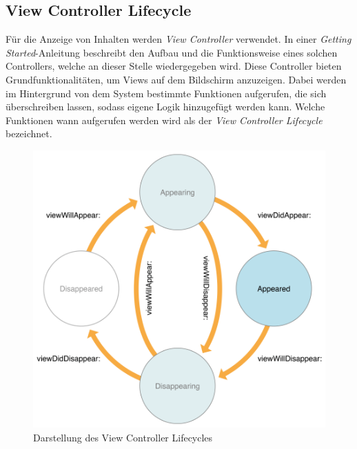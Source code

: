 \subsection{View Controller Lifecycle}
Für die Anzeige von Inhalten werden \textit{View Controller} verwendet.
In einer \textit{Getting Started}-Anleitung beschreibt \textcite{APP2016} den Aufbau und die Funktionsweise eines solchen Controllers, welche an dieser Stelle wiedergegeben wird.
Diese Controller bieten Grundfunktionalitäten, um Views auf dem Bildschirm anzuzeigen.
Dabei werden im Hintergrund von dem System bestimmte Funktionen aufgerufen, die sich überschreiben lassen, sodass eigene Logik hinzugefügt werden kann.
Welche Funktionen wann aufgerufen werden wird als der \textit{View Controller Lifecycle} bezeichnet.
\begin{figure}[h!]
	\centering
	\includegraphics[scale=0.5]{images/view-controller-lifecycle}
	\caption{Darstellung des View Controller Lifecycles \parencite{APP2016}}
	\label{fig:view-controller-lifecycle}
\end{figure}
